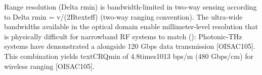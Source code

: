 {}\markdownRendererUlItemEnd 
\markdownRendererUlEndTight \markdownRendererInterblockSeparator
{}
\markdownRendererSectionEnd \markdownRendererSectionBegin
{}\markdownRendererInterblockSeparator
{}Range resolution (\markdownRendererDollarSign{}\markdownRendererBackslash{}Delta r\markdownRendererUnderscore{}\markdownRendererLeftBrace{}\markdownRendererBackslash{}min\markdownRendererRightBrace{}\markdownRendererDollarSign{}) is bandwidth-limited in two-way sensing according to \markdownRendererDollarSign{}\markdownRendererBackslash{}Delta r\markdownRendererUnderscore{}\markdownRendererLeftBrace{}\markdownRendererBackslash{}min\markdownRendererRightBrace{} = v/(2B\markdownRendererUnderscore{}\markdownRendererLeftBrace{}\markdownRendererBackslash{}text\markdownRendererLeftBrace{}eff\markdownRendererRightBrace{}\markdownRendererRightBrace{})\markdownRendererDollarSign{} (two-way ranging convention). The ultra-wide bandwidths available in the optical domain enable millimeter-level resolution that is physically difficult for narrowband RF systems to match ():\markdownRendererInterblockSeparator
{}\markdownRendererUlBeginTight
\markdownRendererUlItem {} Photonic-THz systems have demonstrated a  alongside 120 Gbps data transmission [O\markdownRendererUnderscore{}ISAC\markdownRendererUnderscore{}105].\markdownRendererUlItemEnd 
\markdownRendererUlItem {} This combination yields \markdownRendererDollarSign{}\markdownRendererBackslash{}text\markdownRendererLeftBrace{}CRQ\markdownRendererRightBrace{}\markdownRendererLeftBrace{}\markdownRendererBackslash{}min\markdownRendererRightBrace{}\markdownRendererDollarSign{} of \markdownRendererDollarSign{}4.8\markdownRendererBackslash{}times10\markdownRendererCircumflex{}\markdownRendererLeftBrace{}13\markdownRendererRightBrace{}\markdownRendererDollarSign{} bps/m (480 Gbps/cm) for wireless ranging [O\markdownRendererUnderscore{}ISAC\markdownRendererUnderscore{}105].\markdownRendererSoftLineBreak
